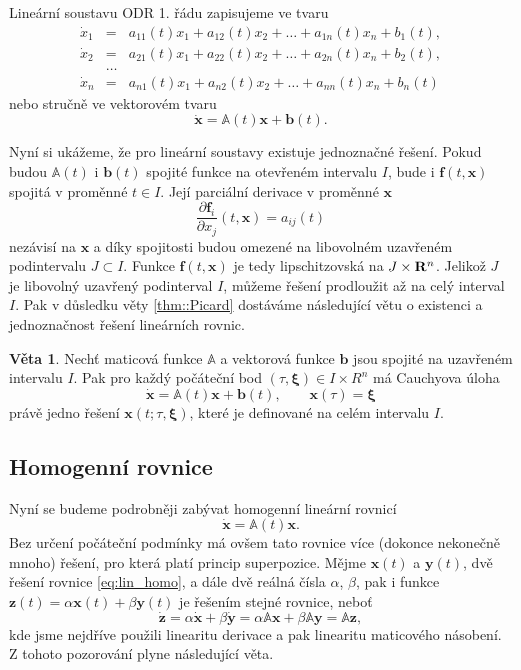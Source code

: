 \documentclass[a4paper, 12pt]{book}
\theoremstyle{definition}
\newtheorem{theorem}{Věta}[section]
\def\Real{{\rm\bf R}}
\def\vc#1{\mathbf{\boldsymbol{#1}}}     %
\def\tn#1{{\mathbb{#1}}}    %
\def\prtl{\partial}                                        %
\begin{document}
Lineární soustavu ODR 1. řádu zapisujeme ve tvaru
\begin{equation}
\begin{array}{rcl}
\dot x_1&=&a_{11}(t)x_1+a_{12}(t)x_2+\dots+a_{1n}(t)x_n+b_1(t),\\
\dot x_2&=&a_{21}(t)x_1+a_{22}(t)x_2+\dots+a_{2n}(t)x_n+b_2(t),\\
&\dots&\\
\dot x_n&=&a_{n1}(t)x_1+a_{n2}(t)x_2+\dots+a_{nn}(t)x_n+b_n(t)
\end{array}
\end{equation}
nebo stručně ve vektorovém tvaru
\begin{equation}
\label{eq:linODR}
\dot {\vc x}={\tn A}(t)\vc x+{\vc b}(t).
\end{equation}

Nyní si ukážeme, že pro lineární soustavy existuje jednoznačné řešení. 
Pokud budou $\tn A(t)$ i $\vc b(t)$ spojité funkce na otevřeném intervalu $I$, bude i $\vc f(t, \vc x)$ 
spojitá v proměnné $t\in I$. Její parciální derivace v proměnné $\vc x$
\[
  \frac{\prtl\vc f_i}{\prtl x_j}(t,\vc x) = a_{ij}(t)
\]
nezávisí na $\vc x$ a díky spojitosti budou omezené na libovolném uzavřeném podintervalu $J\subset I$. Funkce $\vc f(t,\vc x)$ je tedy lipschitzovská na $J\times \Real^n$.
Jelikož $J$ je libovolný uzavřený podinterval $I$, můžeme řešení prodloužit až na celý interval $I$.
Pak v důsledku věty \ref{thm::Picard} dostáváme následující větu o existenci a jednoznačnost řešení lineárních rovnic.

\begin{theorem}
Nechť maticová funkce $\tn A$ a vektorová funkce $\vc b$ jsou spojité na 
uzavřeném intervalu $I$. Pak pro každý počáteční bod $(\tau,\vc\xi)\in I\times R^n$ má
Cauchyova úloha
\begin{equation}
\dot {\vc x}={\tn A}(t)\vc x+{\vc b}(t),\qquad \vc x(\tau)=\vc\xi
\end{equation}
právě jedno řešení $\vc x(t;\tau,\vc\xi)$, které je definované na celém 
intervalu $I$.
\end{theorem}

\subsection{Homogenní rovnice}
Nyní se budeme podrobněji zabývat homogenní lineární rovnicí
\begin{equation}
    \label{eq:lin_homo}
    \dot{\vc x}={\tn A}(t)\vc x.
\end{equation}
Bez určení počáteční podmínky má ovšem tato rovnice více (dokonce nekonečně mnoho) řešení, pro která platí princip superpozice.
Mějme $\vc x(t)$ a $\vc y(t)$, dvě řešení rovnice \eqref{eq:lin_homo}, a dále dvě reálná čísla $\alpha$, $\beta$, 
pak i funkce $\vc z(t)=\alpha\vc x(t) + \beta\vc y(t)$ je 
řešením stejné rovnice, neboť
\[
   \dot{\vc z} = \alpha\dot{\vc x} + \beta\dot{\vc y} = \alpha\tn A \vc x  +  \beta \tn A \vc y  = \tn A \vc z,
\]
kde jsme nejdříve použili linearitu derivace a pak linearitu maticového násobení.
Z tohoto pozorování plyne následující věta.
\end{document}
